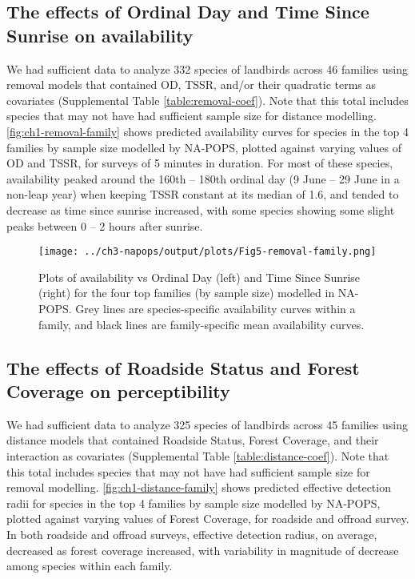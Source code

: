 \subsection{The effects of Ordinal Day and Time Since Sunrise on availability}
\par We had sufficient data to analyze 332 species of landbirds across 46 families using removal models that contained OD, TSSR, and/or their quadratic terms as covariates (Supplemental Table \ref{table:removal-coef}). Note that this total includes species that may not have had sufficient sample size for distance modelling. \autoref{fig:ch1-removal-family} shows predicted availability curves for species in the top 4 families by sample size modelled by NA-POPS, plotted against varying values of OD and TSSR, for surveys of 5 minutes in duration. For most of these species, availability peaked around the 160th – 180th ordinal day (9 June – 29 June in a non-leap year) when keeping TSSR constant at its median of 1.6, and tended to decrease as time since sunrise increased, with some species showing some slight peaks between 0 – 2 hours after sunrise. 

\begin{figure}[h]
	\centering
	\texttt{[image: ../ch3-napops/output/plots/Fig5-removal-family.png]}
	\caption{\label{fig:ch1-removal-family}Plots of availability vs Ordinal Day (left) and Time Since Sunrise (right) for the four top families (by sample size) modelled in NA-POPS. Grey lines are species-specific availability curves within a family, and black lines are family-specific mean availability curves.}
\end{figure}

\subsection{The effects of Roadside Status and Forest Coverage on perceptibility}
\par We had sufficient data to analyze 325 species of landbirds across 45 families using distance models that contained Roadside Status, Forest Coverage, and their interaction as covariates (Supplemental Table \ref{table:distance-coef}). Note that this total includes species that may not have had sufficient sample size for removal modelling. \autoref{fig:ch1-distance-family} shows predicted effective detection radii for species in the top 4 families by sample size modelled by NA-POPS, plotted against varying values of Forest Coverage, for roadside and offroad survey. In both roadside and offroad surveys, effective detection radius, on average, decreased as forest coverage increased, with variability in magnitude of decrease among species within each family. 

